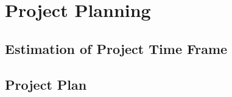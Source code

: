\chapter{Project Planning}
\label{ch:project-planning}

\section{Estimation of Project Time Frame}
\label{sec:estimation-of-project-time-frame}

\section{Project Plan}
\label{sec:project-plan}

